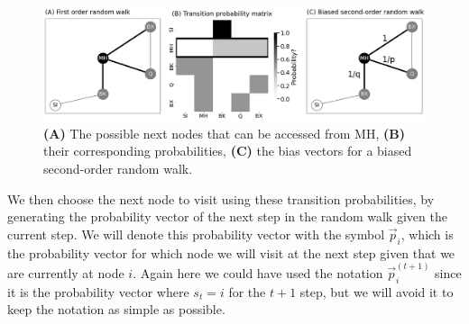 \begin{figure}
    \centering
    \includegraphics[width=\linewidth]{next/Images/one_step.png}
    \caption[A transition step from MH]{\textbf{(A)} The possible next nodes that can be accessed from MH, \textbf{(B)} their corresponding probabilities, \textbf{(C)} the bias vectors for a biased second-order random walk.}
    \label{fig:next:diff:step}
\end{figure}

We then choose the next node to visit using these transition probabilities, by generating the probability vector of the next step in the random walk given the current step. We will denote this probability vector with the symbol $\vec p_i$, which is the probability vector for which node we will visit at the next step given that we are currently at node $i$. Again here we could have used the notation $\vec p_i^{(t + 1)}$ since it is the probability vector where $s_t = i$ for the $t+1$ step, but we will avoid it to keep the notation as simple as possible.

